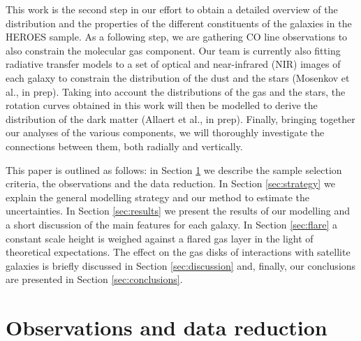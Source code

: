 \documentclass{aa}
\begin{document}
\par
This work is the second step in our effort to obtain a detailed overview of the distribution and the properties of the different constituents of the galaxies in the HEROES sample. As a following step, we are gathering CO line observations to also constrain the molecular gas component. Our team is currently also fitting radiative transfer models to a set of optical and near-infrared (NIR) images of each galaxy to constrain the distribution of the dust and the stars (Mosenkov et al., in prep). Taking into account the distributions of the gas and the stars, the rotation curves obtained in this work will then be modelled to derive the distribution of the dark matter (Allaert et al., in prep). Finally, bringing together our analyses of the various components, we will thoroughly investigate the connections between them, both radially and vertically.
\par
This paper is outlined as follows: in Section \ref{sec:obs} we describe the sample selection criteria, the observations and the data reduction. In Section \ref{sec:strategy} we explain the general modelling strategy and our method to estimate the uncertainties. In Section \ref{sec:results} we present the results of our modelling and a short discussion of the main features for each galaxy. In Section \ref{sec:flare} a constant scale height is weighed against a flared gas layer in the light of theoretical expectations. The effect on the gas disks of interactions with satellite galaxies is briefly discussed in Section \ref{sec:discussion} and, finally, our conclusions are presented in Section \ref{sec:conclusions}.

\section{Observations and data reduction}
\label{sec:obs}
\end{document}
